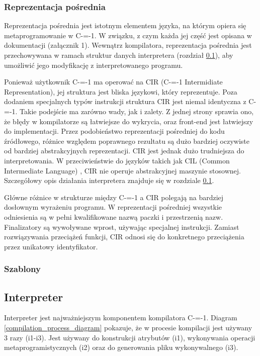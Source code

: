 \subsubsection{Reprezentacja pośrednia}
\label{implementation:intermidiate_representation}
Reprezentacja pośrednia jest istotnym elementem języka, na którym opiera się metaprogramowanie w C-=-1.
W związku, z czym każda jej część jest opisana w dokumentacji (załącznik 1).
Wewnątrz kompilatora, reprezentacja pośrednia jest przechowywana w ramach struktur danych interpretera (rozdział \ref{interpreter}), aby umożliwić jego modyfikację z interpretowanego programu.

Ponieważ użytkownik C-=-1 ma operować na CIR (C-=-1 Intermidiate Representation), jej struktura jest bliska językowi, który reprezentuje. 
Poza dodaniem specjalnych typów instrukcji struktura CIR jest niemal identyczna z C-=-1.
Takie podejście ma zarówno wady, jak i zalety. 
Z jednej strony sprawia ono, że błędy w kompilatorze są łatwiejsze do wykrycia, oraz front-end jest łatwiejszy do implementacji.
Przez podobieństwo reprezentacji pośredniej do kodu źródłowego, różnice względem poprawnego rezultatu są dużo bardziej oczywiste od bardziej abstrakcyjnych reprezentacji.
CIR jest jednak dużo trudniejsza do interpretowania.
W przeciwieństwie do języków takich jak CIL (Common Intermediate Language) \cite{ecma:cli}, CIR nie operuje abstrakcyjnej maszynie stosownej.
Szczegółowy opis działania interpretera znajduje się w rozdziale \ref{interpreter}.

Główne różnice w strukturze między C-=-1 a CIR polegają na bardziej dosłownym wyrażeniu programu. W reprezentacji pośredniej wszystkie odniesienia są w pełni kwalifikowane nazwą paczki i przestrzenią nazw. Finalizatory są wywoływane wprost, używając specjalnej instrukcji. Zamiast rozwiązywania przeciążeń funkcji, CIR odnosi się do konkretnego przeciążenia przez unikatowy identyfikator.

\subsubsection{Szablony}
\label{implementation:generics}

\subsection{Interpreter}
\label{interpreter}

Interpreter jest najważniejszym komponentem kompilatora C-=-1.
Diagram \ref{compilation_process_diagram} pokazuje, że w procesie kompilacji jest używany 3 razy (i1-i3).
Jest używany do konstrukcji atrybutów (i1), wykonywania operacji metaprogramistycznych (i2) oraz do generowania pliku wykonywalnego (i3).

